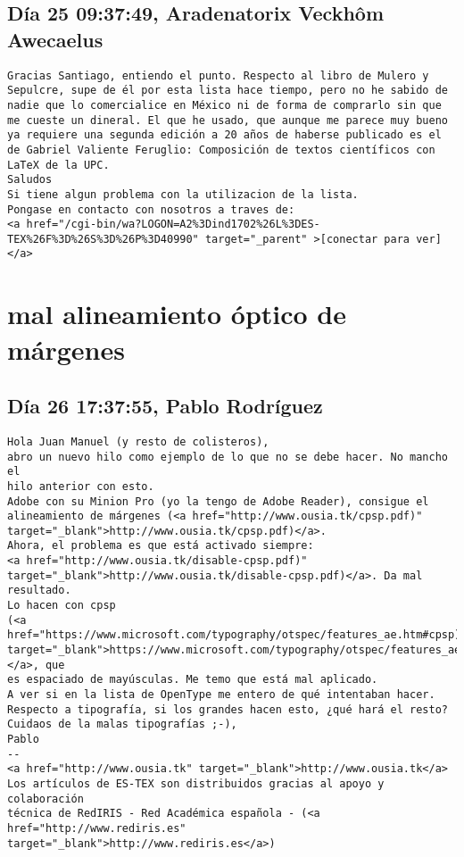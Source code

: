 \documentclass[a4paper,10pt]{article}
\begin{document}
\subsection{Día 25 09:37:49, Aradenatorix Veckhôm Awecaelus}

\begin{lstlisting}
Gracias Santiago, entiendo el punto. Respecto al libro de Mulero y
Sepulcre, supe de él por esta lista hace tiempo, pero no he sabido de
nadie que lo comercialice en México ni de forma de comprarlo sin que
me cueste un dineral. El que he usado, que aunque me parece muy bueno
ya requiere una segunda edición a 20 años de haberse publicado es el
de Gabriel Valiente Feruglio: Composición de textos científicos con
LaTeX de la UPC.
Saludos
Si tiene algun problema con la utilizacion de la lista.
Pongase en contacto con nosotros a traves de:
<a href="/cgi-bin/wa?LOGON=A2%3Dind1702%26L%3DES-TEX%26F%3D%26S%3D%26P%3D40990" target="_parent" >[conectar para ver]</a>

\end{lstlisting}
\section{mal alineamiento óptico de márgenes}

\subsection{Día 26 17:37:55, Pablo Rodríguez}

\begin{lstlisting}
Hola Juan Manuel (y resto de colisteros),
abro un nuevo hilo como ejemplo de lo que no se debe hacer. No mancho el
hilo anterior con esto.
Adobe con su Minion Pro (yo la tengo de Adobe Reader), consigue el
alineamiento de márgenes (<a href="http://www.ousia.tk/cpsp.pdf)" target="_blank">http://www.ousia.tk/cpsp.pdf)</a>.
Ahora, el problema es que está activado siempre:
<a href="http://www.ousia.tk/disable-cpsp.pdf)" target="_blank">http://www.ousia.tk/disable-cpsp.pdf)</a>. Da mal resultado.
Lo hacen con cpsp
(<a href="https://www.microsoft.com/typography/otspec/features_ae.htm#cpsp)" target="_blank">https://www.microsoft.com/typography/otspec/features_ae.htm#cpsp)</a>, que
es espaciado de mayúsculas. Me temo que está mal aplicado.
A ver si en la lista de OpenType me entero de qué intentaban hacer.
Respecto a tipografía, si los grandes hacen esto, ¿qué hará el resto?
Cuidaos de la malas tipografías ;-),
Pablo
-- 
<a href="http://www.ousia.tk" target="_blank">http://www.ousia.tk</a>
Los artículos de ES-TEX son distribuidos gracias al apoyo y colaboración 
técnica de RedIRIS - Red Académica española - (<a href="http://www.rediris.es" target="_blank">http://www.rediris.es</a>)

\end{lstlisting}
\end{document}
